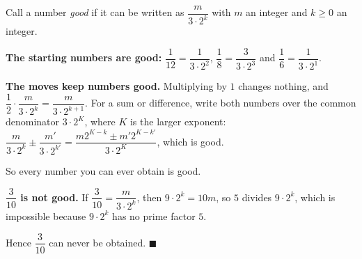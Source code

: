 Call a number \emph{good} if it can be written as $\dfrac{m}{3\cdot2^k}$ with $m$ an integer and $k\ge0$ an integer.

\textbf{The starting numbers are good:} $\dfrac{1}{12}=\dfrac{1}{3\cdot2^2}$, $\dfrac{1}{8}=\dfrac{3}{3\cdot2^3}$ and $\dfrac{1}{6}=\dfrac{1}{3\cdot2^1}$.

\textbf{The moves keep numbers good.} Multiplying by $1$ changes nothing, and $\dfrac{1}{2}\cdot\dfrac{m}{3\cdot2^k}=\dfrac{m}{3\cdot2^{k+1}}$. For a sum or difference, write both numbers over the common denominator $3\cdot2^K$, where $K$ is the larger exponent: $\dfrac{m}{3\cdot2^k}\pm\dfrac{m'}{3\cdot2^{k'}}=\dfrac{m2^{K-k}\pm m'2^{K-k'}}{3\cdot2^K}$, which is good.

So every number you can ever obtain is good.

\textbf{$\dfrac{3}{10}$ is not good.} If $\dfrac{3}{10}=\dfrac{m}{3\cdot2^k}$, then $9\cdot2^k=10m$, so $5$ divides $9\cdot2^k$, which is impossible because $9\cdot2^k$ has no prime factor $5$.

Hence $\dfrac{3}{10}$ can never be obtained. $\blacksquare$

